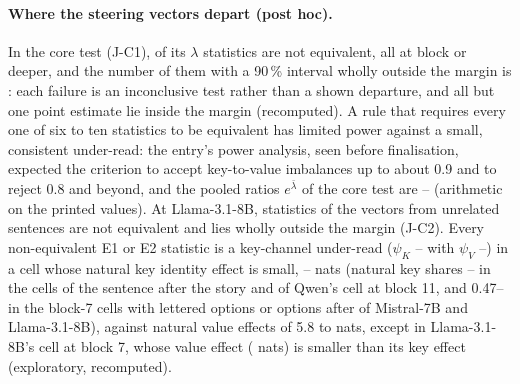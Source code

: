 \paragraph{Where the steering vectors depart (post hoc).} In the core test (J-C1), \JcOneCoreNe{} of its \JcOneCoreN{} $\lambda$ statistics are not equivalent, all at block \JcOneCoreNeDepthMin{} or deeper, and the number of them with a 90\,\% interval wholly outside the margin is \JcOneCoreNeOut{}: each failure is an inconclusive test rather than a shown departure, and all but one point estimate lie inside the margin (recomputed). A rule that requires every one of six to ten statistics to be equivalent has limited power against a small, consistent under-read: the entry's power analysis, seen before finalisation, expected the criterion to accept key-to-value imbalances up to about 0.9 and to reject 0.8 and beyond, and the pooled ratios $e^{\bar\lambda}$ of the core test are -- (arithmetic on the printed values). At Llama-3.1-8B, \JcTwoLlamaEtwoNe{} statistics of the vectors from unrelated sentences are not equivalent and \JcTwoLlamaEtwoNeOut{} lies wholly outside the margin (J-C2). Every non-equivalent E1 or E2 statistic is a key-channel under-read ($\psi_K$ \JcOneNePsiKMin{}--\JcOneNePsiKMax{} with $\psi_V$ \JcOneNePsiVMin{}--\JcOneNePsiVMax{}) in a cell whose natural key identity effect is small, \JcOneNeIDKMin{}--\JcOneNeIDKMax{} nats (natural key shares \JcOneNeShareSmallMin{}--\JcOneNeShareSmallMax{} in the cells of the sentence after the story and of Qwen's \fmtOpt{} cell at block 11, and 0.47--\JcOneNeShareMax{} in the block-7 cells with lettered options or options after of Mistral-7B and Llama-3.1-8B), against natural value effects of 5.8 to \JcOneNeIDVMax{} nats, except in Llama-3.1-8B's \fmtOpt{} cell at block 7, whose value effect (\JcOneNeIDVMin{} nats) is smaller than its key effect (exploratory, recomputed). %

